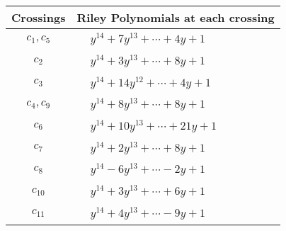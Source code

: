 \documentclass[1p]{elsarticle_modified}
\theoremstyle{definition}
\begin{document}
\begin{tabular}{m{50pt}|m{274pt}}
Crossings & \hspace{64pt}Riley Polynomials at each crossing \\
\hline $$\begin{aligned}c_{1},c_{5}\end{aligned}$$&$\begin{aligned}
&y^{14}+7 y^{13}+\cdots+4 y+1
\end{aligned}$\\
\hline $$\begin{aligned}c_{2}\end{aligned}$$&$\begin{aligned}
&y^{14}+3 y^{13}+\cdots+8 y+1
\end{aligned}$\\
\hline $$\begin{aligned}c_{3}\end{aligned}$$&$\begin{aligned}
&y^{14}+14 y^{12}+\cdots+4 y+1
\end{aligned}$\\
\hline $$\begin{aligned}c_{4},c_{9}\end{aligned}$$&$\begin{aligned}
&y^{14}+8 y^{13}+\cdots+8 y+1
\end{aligned}$\\
\hline $$\begin{aligned}c_{6}\end{aligned}$$&$\begin{aligned}
&y^{14}+10 y^{13}+\cdots+21 y+1
\end{aligned}$\\
\hline $$\begin{aligned}c_{7}\end{aligned}$$&$\begin{aligned}
&y^{14}+2 y^{13}+\cdots+8 y+1
\end{aligned}$\\
\hline $$\begin{aligned}c_{8}\end{aligned}$$&$\begin{aligned}
&y^{14}-6 y^{13}+\cdots-2 y+1
\end{aligned}$\\
\hline $$\begin{aligned}c_{10}\end{aligned}$$&$\begin{aligned}
&y^{14}+3 y^{13}+\cdots+6 y+1
\end{aligned}$\\
\hline $$\begin{aligned}c_{11}\end{aligned}$$&$\begin{aligned}
&y^{14}+4 y^{13}+\cdots-9 y+1
\end{aligned}$\\
\hline
\end{tabular}\\~\\
\end{document}
